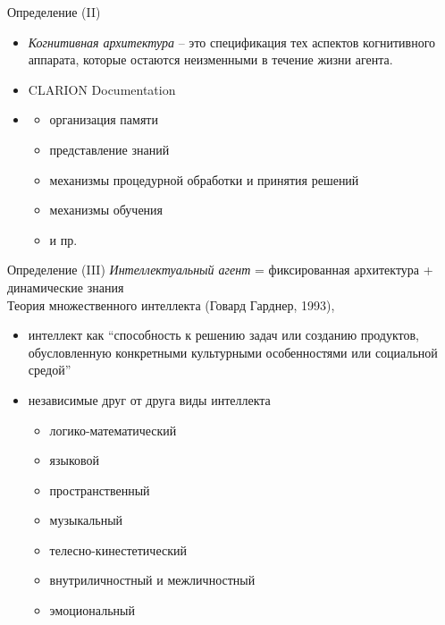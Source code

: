 \documentclass{beamer}
\begin{document}
\begin{frame}{Определение (II)}
\begin{itemize}
    \item[] \textit{Когнитивная архитектура} -- это спецификация тех аспектов когнитивного аппарата, которые остаются неизменными в течение жизни агента.
    \item[] \hfill CLARION Documentation
    \bigskip
    \item[]
        \begin{itemize}
            \item организация памяти
            \item представление знаний
            \item механизмы процедурной обработки и принятия решений
            \item механизмы обучения
            \item и пр.
        \end{itemize}
\end{itemize}
\end{frame}

\begin{frame}{Определение (III)}
\textit{Интеллектуальный агент} = фиксированная архитектура + динамические знания\\
\bigskip
Теория множественного интеллекта (Говард Гарднер, 1993), 
\begin{itemize}
    \item интеллект как ``способность к решению задач или созданию продуктов, обусловленную конкретными культурными особенностями или социальной средой''
    \medskip
    \item независимые друг от друга виды интеллекта
        \begin{itemize}
           \item логико-математический
           \item языковой
           \item пространственный
           \item музыкальный
           \item телесно-кинестетический
           \item внутриличностный и межличностный
           \item эмоциональный
        \end{itemize}
\end{itemize}
\end{frame}
\end{document}
